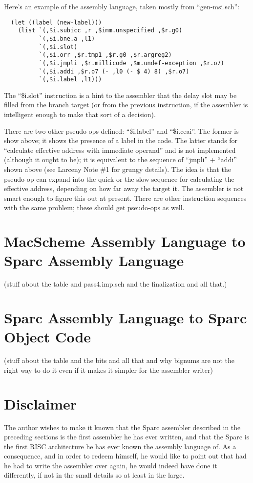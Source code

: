 Here's an example of the assembly language, taken mostly from ``gen-msi.sch'':

\begin{minipage}{\linewidth}
\begin{verbatim}
  (let ((label (new-label)))
    (list `(,$i.subicc ,r ,$imm.unspecified ,$r.g0)
          `(,$i.bne.a ,l1)
          `(,$i.slot)
          `(,$i.orr ,$r.tmp1 ,$r.g0 ,$r.argreg2)
          `(,$i.jmpli ,$r.millicode ,$m.undef-exception ,$r.o7)
          `(,$i.addi ,$r.o7 (- ,l0 (- $ 4) 8) ,$r.o7)
          `(,$i.label ,l1)))
\end{verbatim}
\end{minipage}

The ``\$i.slot'' instruction is a hint to the assembler that the delay
slot may be filled from the branch target (or from the previous instruction,
if the assembler is intelligent enough to make that sort of a decision).

There are two other pseudo-ops defined: ``\$i.label'' and ``\$i.ceai''.  The
former is show above; it shows the presence of a label in the code.  The
latter stands for ``calculate effective address with immediate operand'' and
is not implemented (although it ought to be); it is equivalent to the
sequence of ``jmpli'' + ``addi'' shown above (see Larceny Note \#1 for
grungy details). The idea is that the pseudo-op can expand into the quick or
the slow sequence for calculating the effective address, depending on how
far away the target it. The assembler is not smart enough to figure this out
at present. There are other instruction sequences with the same problem;
these should get pseudo-ops as well.

\section{MacScheme Assembly Language to Sparc Assembly Language}

(stuff about the table and pass4.imp.sch and the finalization and all that.)

\section{Sparc Assembly Language to Sparc Object Code}

(stuff about the table and the bits and all that and why bignums are not
the right way to do it even if it makes it simpler for the assembler writer)

\section{Disclaimer}

The author wishes to make it known that the Sparc assembler described
in the preceding sections is the first assembler he has ever written,
and that the Sparc is the first RISC architecture he has ever known
the assembly language of. As a consequence, and in order to redeem
himself, he would like to point out that had he had to write the
assembler over again, he would indeed have done it differently, if not
in the small details so at least in the large.



